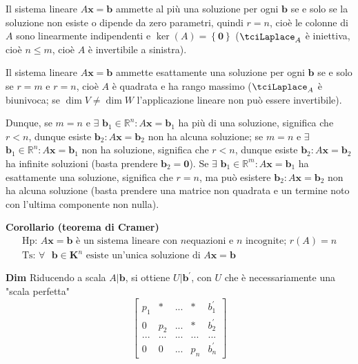 \documentclass{article}
\begin{document}
\begin{enumerate}
Il sistema lineare $A\mathbf{x=b}$ ammette al pi\`{u} una soluzione per ogni 
$\mathbf{b}$ se e solo se la soluzione non esiste o dipende da zero
parametri, quindi $r=n$, cio\`{e} le colonne di $A$ sono linearmente
indipendenti e $\ker \left( A\right) =\left\{ \mathbf{0}\right\} $ ($%
\tciLaplace _{A}$ \`{e} iniettiva, cio\`{e} $n\leq m$, cio\`{e} $A$ \`{e}
invertibile a sinistra).

Il sistema lineare $A\mathbf{x=b}$ ammette esattamente una soluzione per
ogni $\mathbf{b}$ se e solo se $r=m$ e $r=n$, cio\`{e} $A$ \`{e} quadrata e
ha rango massimo ($\tciLaplace _{A}$ \`{e} biunivoca; se $\dim V\neq \dim W$
l'applicazione lineare non pu\`{o} essere invertibile).

Dunque, se $m=n$ e $\exists $ $\mathbf{b}_{1}\in 
\mathbb{R}
^{n}:A\mathbf{x=b}_{1}$ ha pi\`{u} di una soluzione, significa che $r<n$,
dunque esiste $\mathbf{b}_{2}:A\mathbf{x=b}_{2}$ non ha alcuna soluzione; se 
$m=n$ e $\exists $ $\mathbf{b}_{1}\in 
\mathbb{R}
^{n}:A\mathbf{x=b}_{1}$ non ha soluzione, significa che $r<n$, dunque esiste 
$\mathbf{b}_{2}:A\mathbf{x=b}_{2}$ ha infinite soluzioni (basta prendere $%
\mathbf{b}_{2}=\mathbf{0}$). Se $\exists $ $\mathbf{b}_{1}\in 
\mathbb{R}
^{m}:A\mathbf{x=b}_{1}$ ha esattamente una soluzione, significa che $r=n$,
ma pu\`{o} esistere $\mathbf{b}_{2}:A\mathbf{x=b}_{2}$ non ha alcuna
soluzione (basta prendere una matrice non quadrata e un termine noto con
l'ultima componente non nulla).
\end{enumerate}

\textbf{Corollario (teorema di Cramer)}%
\begin{gather*}
\text{Hp}\text{: }A\mathbf{x=b}\text{ \`{e} un sistema lineare con }n\text{
equazioni e }n\text{ incognite; }r\left( A\right) =n \\
\text{Ts}\text{: }\forall \text{ }\mathbf{b\in K}^{n}\text{ esiste un'unica
soluzione di }A\mathbf{x=b}
\end{gather*}

\textbf{Dim} Riducendo a scala $A|\mathbf{b}$, si ottiene $U|\mathbf{b}%
^{\prime }$, con $U$ che \`{e} necessariamente una "scala perfetta"%
\begin{equation*}
\left[ 
\begin{array}{ccccc}
p_{1} & \ast & ... & \ast & b_{1}^{\prime } \\ 
0 & p_{2} & ... & \ast & b_{2}^{\prime } \\ 
... & ... & ... & ... & ... \\ 
0 & 0 & ... & p_{n} & b_{n}^{\prime }%
\end{array}%
\right]
\end{equation*}
\end{document}
